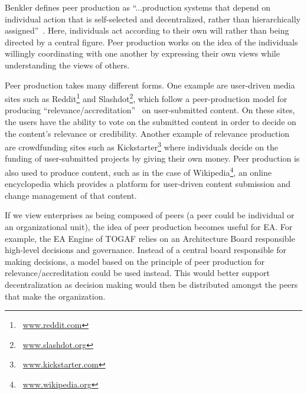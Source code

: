 Benkler defines peer production as ``...production systems that depend on individual action that is self-selected and decentralized, rather than hierarchically assigned''~\cite{benkler2006wealth}. Here, individuals act according to their own will rather than being directed by a central figure. Peer production works on the idea of the individuals willingly coordinating with one another by expressing their own views while understanding the views of others.

%
%

Peer production takes many different forms. One example are user-driven media sites such as Reddit\footnote{~\url{www.reddit.com}} and Slashdot\footnote{~\url{www.slashdot.org}}, which follow a peer-production model for producing ``relevance/accreditation''~\cite{benkler2006wealth} on user-submitted content. On these sites, the users have the ability to vote on the submitted content in order to decide on the content's relevance or credibility. Another example of relevance production are crowdfunding sites such as Kickstarter\footnote{~\url{www.kickstarter.com}} where individuals decide on the funding of user-submitted projects by giving their own money. Peer production is also used to produce content, such as in the case of Wikipedia\footnote{~\url{www.wikipedia.org}}, an online encyclopedia which provides a platform for user-driven content submission and change management of that content.

%
%

If we view enterprises as being composed of peers (a peer could be individual or an organizational unit), the idea of peer production becomes useful for EA. For example, the EA  Engine of TOGAF relies on an Architecture Board responsible high-level decisions and governance. Instead of a central board responsible for making decisions, a model based on the principle of peer production for relevance/accreditation could be used instead. This would better support decentralization as decision making would then be distributed amongst the peers that make the organization.



